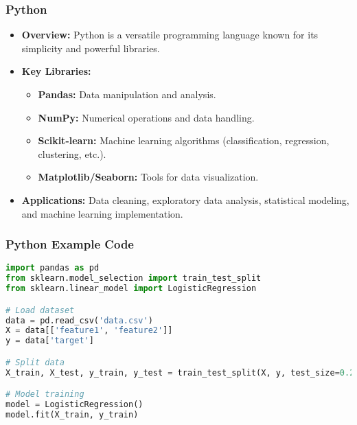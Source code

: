 \documentclass[aspectratio=169]{beamer}
\begin{document}
\begin{frame}
    \frametitle{Python}
    \begin{itemize}
        \item \textbf{Overview:} 
        Python is a versatile programming language known for its simplicity and powerful libraries.
        
        \item \textbf{Key Libraries:} 
        \begin{itemize}
            \item \textbf{Pandas:} Data manipulation and analysis.
            \item \textbf{NumPy:} Numerical operations and data handling.
            \item \textbf{Scikit-learn:} Machine learning algorithms (classification, regression, clustering, etc.).
            \item \textbf{Matplotlib/Seaborn:} Tools for data visualization.
        \end{itemize}
        
        \item \textbf{Applications:} 
        Data cleaning, exploratory data analysis, statistical modeling, and machine learning implementation.
    \end{itemize}
\end{frame}

\begin{frame}[fragile]
    \frametitle{Python Example Code}
    \begin{lstlisting}[language=Python]
import pandas as pd
from sklearn.model_selection import train_test_split
from sklearn.linear_model import LogisticRegression

# Load dataset
data = pd.read_csv('data.csv')
X = data[['feature1', 'feature2']]
y = data['target']

# Split data
X_train, X_test, y_train, y_test = train_test_split(X, y, test_size=0.2)

# Model training
model = LogisticRegression()
model.fit(X_train, y_train)
    \end{lstlisting}
\end{frame}
\end{document}
